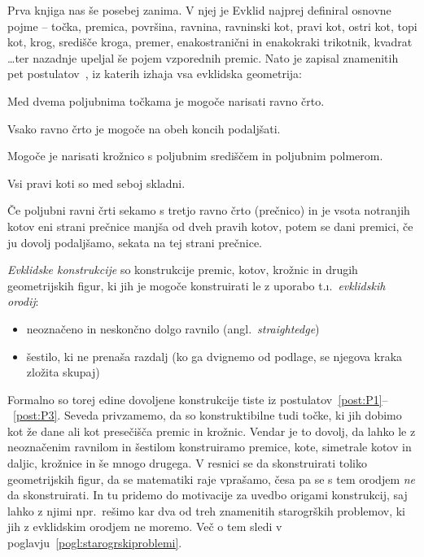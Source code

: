 Prva knjiga nas še posebej zanima. V njej je Evklid najprej definiral osnovne pojme -- točka, premica, površina, ravnina, ravninski kot, pravi kot, ostri kot, topi kot, krog, središče kroga, premer, enakostranični in enakokraki trikotnik, kvadrat \ldots ter nazadnje upeljal še pojem vzporednih premic. Nato je zapisal znamenitih pet postulatov~\cite{euclidI}, iz katerih izhaja vsa evklidska geometrija:

\renewcommand{\thepostulat}{P\arabic{postulat}}

\begin{postulat}
    \label{post:P1}
    Med dvema poljubnima točkama je mogoče narisati ravno črto.
\end{postulat}
\begin{postulat}
    \label{post:P2}
    Vsako ravno črto je mogoče na obeh koncih podaljšati.
\end{postulat}
\begin{postulat}
    \label{post:P3}
    Mogoče je narisati krožnico s poljubnim središčem in poljubnim polmerom.
\end{postulat}
\begin{postulat}
    \label{post:P4}
    Vsi pravi koti so med seboj skladni.
\end{postulat}
\begin{postulat}
    \label{post:P5}
    Če poljubni ravni črti sekamo s tretjo ravno črto (prečnico) in je vsota notranjih kotov eni strani prečnice manjša od dveh pravih kotov, potem se dani premici, če ju dovolj podaljšamo, sekata na tej strani prečnice.
\end{postulat}

\emph{Evklidske konstrukcije} so konstrukcije premic, kotov, krožnic in drugih geometrijskih figur, ki jih je mogoče konstruirati le z uporabo t.\i.\ \emph{evklidskih orodij}:

\begin{itemize}
    \item neoznačeno in neskončno dolgo ravnilo (angl.\ \emph{straightedge})
    \item šestilo, ki ne prenaša razdalj (ko ga dvignemo od podlage, se njegova kraka zložita skupaj)
\end{itemize}

Formalno so torej edine dovoljene konstrukcije tiste iz postulatov~\ref{post:P1}--~\ref{post:P3}. Seveda privzamemo, da so konstruktibilne tudi točke, ki jih dobimo kot že dane ali kot presečišča premic in krožnic. Vendar je to dovolj, da lahko le z neoznačenim ravnilom in šestilom konstruiramo premice, kote, simetrale kotov in daljic, krožnice in še mnogo drugega. V resnici se da skonstruirati toliko geometrijskih figur, da se matematiki raje vprašamo, česa pa se s tem orodjem \emph{ne} da skonstruirati. In tu pridemo do motivacije za uvedbo origami konstrukcij, saj lahko z njimi npr.\ rešimo kar dva od treh znamenitih starogrških problemov, ki jih z evklidskim orodjem ne moremo. Več o tem sledi v poglavju~\ref{pogl:starogrskiproblemi}.

